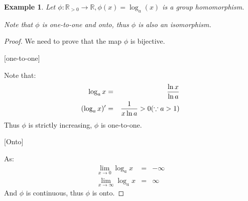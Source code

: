 \documentclass{article}
\theoremstyle{MyNonumberplain}
\theoremstyle{break}
\newtheorem*{proof}{Proof. }
\newcommand{\p}{\phi}
\theoremstyle{break}
\newtheorem{example}{Example}[section]
\theoremstyle{break}
\theoremstyle{definition}
\theoremstyle{break}
\begin{document}
\begin{expbox}
    \begin{example}
        Let $\p : \mathbb{R}_{> 0} \rightarrow \mathbb{R}, \p (x) = \log_a (x)$ is a
        group homomorphism.\bigskip

        Note that $\p$ is one-to-one and onto, thus $\p$ is also an isomorphism. 
    \end{example}
    \begin{prfbox}
        \begin{proof}
            We need to prove that the map $\p$ is bijective.\bigskip

            [one-to-one]\bigskip

            Note that:
            \begin{eqnarray*}
            \log_a x & = & \frac{\ln x}{\ln a}\\
            (\log_a x)' & = & \frac{1}{x \ln a} > 0 \hspace*{\fill} (\because a > 1)
            \end{eqnarray*}
            Thus $\p$ is strictly increasing, $\p$ is one-to-one.\bigskip

            [Onto]\bigskip

            As:
            \begin{eqnarray*}
            \lim_{x \rightarrow 0} \log_a x & = & - \infty\\
            \lim_{x \rightarrow \infty} \log_a x & = & \infty
            \end{eqnarray*}
            And $\p$ is continuous, thus $\p$ is onto.
        \end{proof}
    \end{prfbox}
\end{expbox}
\end{document}
